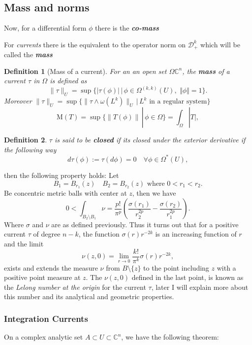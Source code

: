 \documentclass[12pt,twoside,a4paper]{report}
\newtheorem{definition}{Definition}[section]
\newcommand{\con}{\ensuremath{\mathbb{C}^n}}
\newcommand{\om}{\ensuremath{\Omega}}
\newcommand{\dsheaf}{\ensuremath{\mathcal D }}
\begin{document}
    \subsection{Mass and norms}
    Now, for a differential form $\phi$ there is the \emph{\bf co-mass}


    For \emph{currents} there is the equivalent to the operator norm on $\dsheaf^k_{+}$ which will be called the \emph{\bf mass}
\begin{definition}[Mass of a current]
  For an an open set $\om\con$, the {\bf mass} of a current $\tau$ in $\om$ is defined as 
    \[
        \|\tau\|_U=\sup\{|\tau(\phi)|\,\vert\,\phi\in \om^{(k,k)}(U),\,\,\Vert\phi\Vert=1\}.
    \]
    Moreover $\| \tau\|_U=\sup\{\| \tau\wedge\omega(L^{k})\|_U\,|\,L^{k}\text{ in a regular system}\}$
    \[
        \mathrm{M}(T)=\sup\{\|T(\phi)\|\,|\,\phi\in\om\}=\int_{\om}|T|,
    \]
\end{definition}
    \begin{definition}
    $\tau$ is said to be \emph{\bf closed} if its closed under the exterior derivative if the following way
    \begin{equation}\label{closed}
        d\tau(\phi):=\tau(d\phi)=0\quad\forall\phi\in\om^{*}(U),
      \end{equation}
    \end{definition}
    then the following property holds: Let
    \[
        B_1=B_{r_1}(z)\quad B_2=B_{r_2}(z)\text{ where } 0<r_1<r_2.
    \]
    Be concentric metric balls with center at $z$, then we have
    \[
        0<\int_{B_2\setminus B_1}\nu= \frac{p!}{\pi^{p}}\left(\frac{\sigma(r_1)}{r^{2p}_2}-\frac{\sigma(r_2)}{r^{2p}_1}\right).
    \]
    Where $\sigma$ and $\nu$ are as defined previously. Thus it turns out that for a positive current $\tau$ of degree $n-k$, the function $\sigma(r)r^{-2k}$ is an increasing function of $r$ and the limit
    \begin{equation}\label{lelong-num1}
        \nu(z,0)=\lim_{r\rightarrow 0}\frac{k!}{\pi^{k}}\sigma(r)r^{-2k},
    \end{equation}
    exists and extends the measure $\nu$ from $B\setminus\{z\}$ to the point including $z$ with a positive point measure at $z$. The \(\nu(z,0)\) defined in the last point, is known as the \emph{Lelong number at the origin} for the current \(\tau\), later I will explain more about this number and its analytical and geometric properties.

\subsubsection{Integration Currents}
On a complex analytic set \(A\subset U\subset\con\), we have the following theorem:
\end{document}
